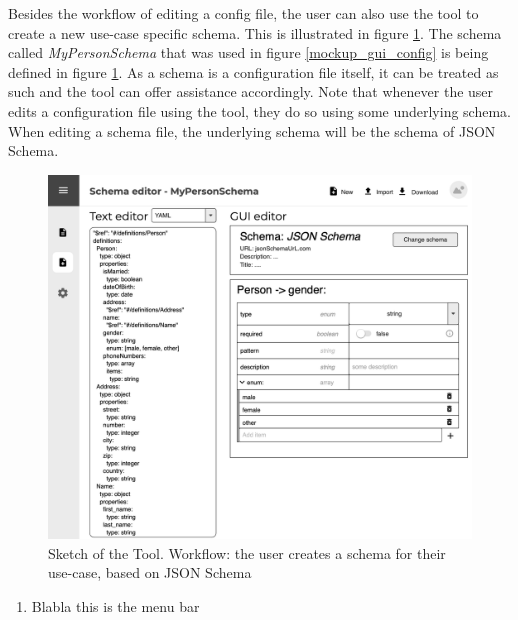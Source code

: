 \documentclass[lettersize,journal]{IEEEtran}
\newcommand{\cfgfile}{configuration file}
\begin{document}
Besides the workflow of editing a config file, the user can also use the tool to create a new use-case specific schema. This is illustrated in figure \ref{mockup_gui_schema}. The schema called \textit{MyPersonSchema} that was used in figure \ref{mockup_gui_config} is being defined in figure \ref{mockup_gui_schema}. As a schema is a \cfgfile{} itself, it can be treated as such and the tool can offer assistance accordingly. Note that whenever the user edits a \cfgfile{} using the tool, they do so using some underlying schema. When editing a schema file, the underlying schema will be the schema of JSON Schema.

\begin{figure}[!t]
\includegraphics[width=\textwidth]{mockup_gui_schema.png}
\caption{Sketch of the Tool. Workflow: the user creates a schema for their use-case, based on JSON Schema}
\label{mockup_gui_schema}
\end{figure}

\begin{enumerate}
    \item Blabla this is the menu bar
\end{enumerate}


 

\end{document}
